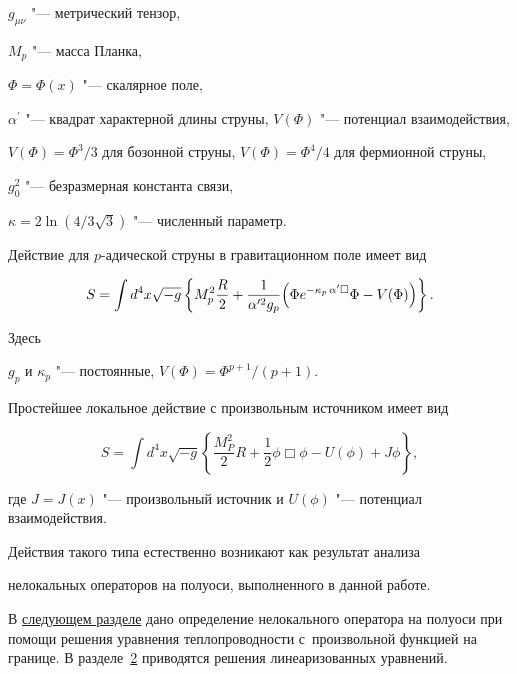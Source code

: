 $g_{\mu\nu}$ "--- метрический тензор,

$M_p$ "--- масса Планка, 

$\Phi=\Phi(x)$ "--- скалярное поле, 

$\alpha^\prime$ "--- квадрат характерной длины струны, $V(\Phi)$ "--- потенциал взаимодействия,

 $V(\Phi)=\Phi^3/3$ для бозонной струны,  $V(\Phi)=\Phi^4/4$ для фермионной струны, 

 $g^2_0$ "--- безразмерная константа связи, 

$\kappa=2\ln(4/3\sqrt{3})$ "--- численный параметр.



Действие для $p$-адической струны в гравитационном поле имеет вид \cite{IA04}

\begin{equation}

\label{p-adic}

S=\int

d^4x\sqrt{-g}\left\{M_p^2\frac{R}{2}+\frac{1}{\alpha ^{\prime 2}g_p}

\Bigl(\Phi

e^{-\kappa_p\, \alpha ^\prime\Box}\Phi-

V(\Phi)\Bigr)\right\}.

\end{equation}

Здесь

$g_p$ и $\kappa_p$ "--- постоянные, $V(\Phi)=\Phi^{p+1}/(p+1)$.





Простейшее локальное действие с произвольным источником имеет вид

\begin{equation}

S=\int d^4x\sqrt{-g}\left\{\frac{M_P^2}{2}R+ \frac{1}{2}

\phi\Box\phi-U(\phi)+J\phi \right\}, \label{L-l-inf-pairs}

\end{equation}

где $J=J(x)$ "--- произвольный источник и $U(\phi)$ "--- потенциал взаимодействия.

Действия такого типа естественно возникают как результат анализа

нелокальных операторов на полуоси, выполненного в данной работе.



В \hyperlink{razd:1}{следующем разделе} дано определение нелокального оператора на полуоси при помощи решения уравнения теплопроводности с~произвольной функцией на границе. В разделе~\hyperlink{razd:2}{2} приводятся решения линеаризованных уравнений.


